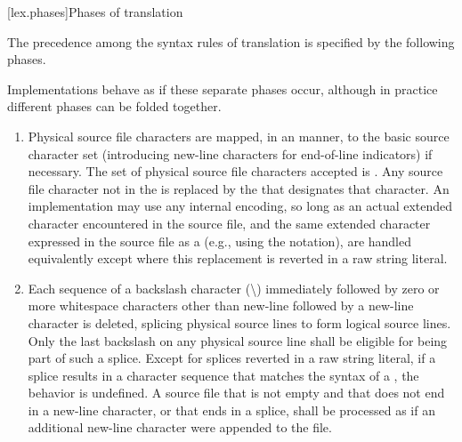 [lex.phases]{Phases of translation}%

\pnum
{}%
The precedence among the syntax rules of translation is specified by the
following phases.
\begin{footnote}
Implementations behave as if these separate phases
occur, although in practice different phases can be folded together.
\end{footnote}

\begin{enumerate}
\item
{}%
%
Physical source file characters are mapped, in an
 manner,
to the basic source character set (introducing new-line characters for end-of-line
indicators) if necessary.
The set of physical source file characters accepted is .
Any
source file character not in the
is replaced by the
 that
designates that character. An implementation may use any internal
encoding, so long as an actual extended character encountered in the
source file, and the same extended character expressed in the source
file as a  (e.g., using the  notation), are handled equivalently
except where this replacement is reverted in a raw string literal.

\item
{}%
Each sequence of a backslash character (\textbackslash)
immediately followed by
zero or more whitespace characters other than new-line followed by
a new-line character is deleted, splicing
physical source lines to form logical source lines. Only the last
backslash on any physical source line shall be eligible for being part
of such a splice.
Except for splices reverted in a raw string literal, if a splice results in
a character sequence that matches the
syntax of a , the behavior is
undefined. A source file that is not empty and that does not end in a new-line
character, or that ends in a splice,
shall be processed as if an additional new-line character were appended
to the file.


\end{enumerate}
